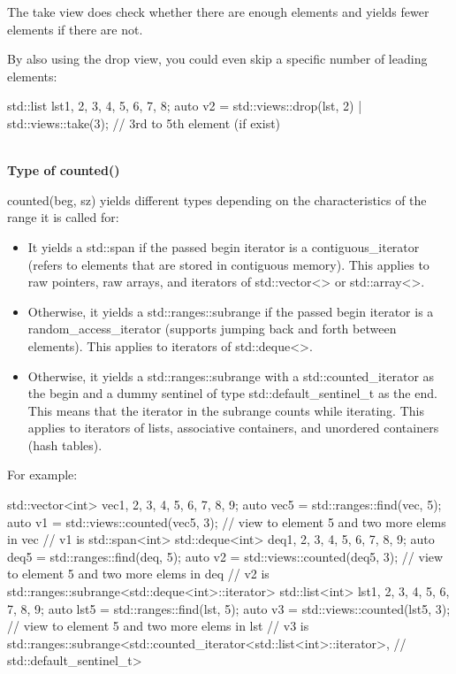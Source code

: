 The take view does check whether there are enough elements and yields fewer elements if there are not.

By also using the drop view, you could even skip a specific number of leading elements:

\begin{cpp}
std::list lst{1, 2, 3, 4, 5, 6, 7, 8};
auto v2 = std::views::drop(lst, 2) | std::views::take(3); // 3rd to 5th element (if exist)
\end{cpp}

\noindent
\hspace*{\fill} \\ %
\textbf{Type of counted()}

counted(beg, sz) yields different types depending on the characteristics of the range it is called for:

\begin{itemize}
\item
It yields a std::span if the passed begin iterator is a contiguous\_iterator (refers to elements that are stored in contiguous memory). This applies to raw pointers, raw arrays, and iterators of std::vector<> or std::array<>.

\item
Otherwise, it yields a std::ranges::subrange if the passed begin iterator is a random\_access\_iterator (supports jumping back and forth between elements). This applies to iterators of std::deque<>.

\item
Otherwise, it yields a std::ranges::subrange with a std::counted\_iterator as the begin and a dummy sentinel of type std::default\_sentinel\_t as the end. This means that the iterator in the subrange counts while iterating. This applies to iterators of lists, associative containers, and unordered containers (hash tables).
\end{itemize}

For example:

\begin{cpp}
std::vector<int> vec{1, 2, 3, 4, 5, 6, 7, 8, 9};
auto vec5 = std::ranges::find(vec, 5);
auto v1 = std::views::counted(vec5, 3); // view to element 5 and two more elems in vec
	// v1 is std::span<int>
std::deque<int> deq{1, 2, 3, 4, 5, 6, 7, 8, 9};
auto deq5 = std::ranges::find(deq, 5);
auto v2 = std::views::counted(deq5, 3); // view to element 5 and two more elems in deq
	// v2 is std::ranges::subrange<std::deque<int>::iterator>
std::list<int> lst{1, 2, 3, 4, 5, 6, 7, 8, 9};
auto lst5 = std::ranges::find(lst, 5);
auto v3 = std::views::counted(lst5, 3); // view to element 5 and two more elems in lst
	// v3 is std::ranges::subrange<std::counted_iterator<std::list<int>::iterator>,
	// std::default_sentinel_t>
\end{cpp}

